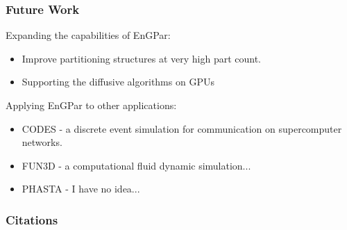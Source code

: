 \documentclass{beamer}
\begin{document}
\begin{frame}
  \frametitle{Future Work}
  Expanding the capabilities of EnGPar:
  \begin{itemize}
    \item Improve partitioning structures at very high part count.
  \item Supporting the diffusive algorithms on GPUs
  \end{itemize}
  Applying EnGPar to other applications:
  \begin{itemize}
  \item CODES - a discrete event simulation for communication on supercomputer networks.
  \item FUN3D - a computational fluid dynamic simulation...
  \item PHASTA - I have no idea...
  \end{itemize}
\end{frame}

\begin{frame}
  \frametitle{Citations}
\end{frame}
  
\end{document}
